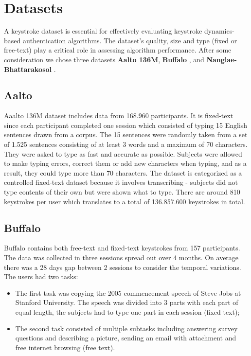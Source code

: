 \section{Datasets}
A keystroke dataset is essential for effectively evaluating keystroke dynamics-based authentication algorithms. The dataset's quality, size and type (fixed or free-text) play a critical role in assessing algorithm performance. After some consideration we chose three datasets \textbf{Aalto 136M}\cite{ref:aalto-136m}, \textbf{Buffalo} \cite{ref:buffalo}, and \textbf{Nanglae-Bhattarakosol} \cite{ref:2dataset}.\\

\subsection{Aalto}

Aaalto 136M dataset includes data from 168.960 participants. It is fixed-text since each participant completed one session which consisted of typing 15 English sentences drawn from a corpus. The 15 sentences were randomly taken from a set of 1.525 sentences consisting of at least 3 words and a maximum of 70 characters. They were asked to type as fast and accurate as possible. Subjects were allowed to make typing errors, correct them or add new characters when typing, and as a result, they could type more than 70 characters. The dataset is categorized as a controlled fixed-text dataset because it involves transcribing - subjects did not type contents of their own but were shown what to type. There are around 810 keystrokes per user which translates to a total of 136.857.600 keystrokes in total.

\subsection{Buffalo}

Buffalo contains both free-text and fixed-text keystrokes from 157 participants. The data was collected in three sessions spread out over 4 months. On average there was a 28 days gap between 2 sessions to consider the temporal variations. The users had two tasks:

\begin{itemize}
    \item  The first task was copying the 2005 commencement speech of Steve Jobs at Stanford University. The speech was divided into 3 parts with each part of equal length, the subjects had to type one part in each session (fixed text);
    \item The second task consisted of multiple subtasks including answering survey questions and describing a picture, sending an email with attachment and free internet browsing (free text).
\end{itemize}

